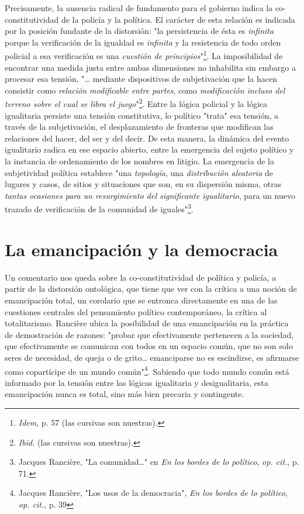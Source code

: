 \documentclass{book}
\begin{document}
Precisamente, la ausencia radical de fundamento para el gobierno indica
la co-constitutividad de la policía y la política. El carácter de esta
relación es indicada por la posición fundante de la distorsión: "la
persistencia de ésta es \emph{infinita} porque la verificación de la
igualdad es \emph{infinita} y la resistencia de todo orden policial a
esa verificación es una \emph{cuestión de principios}"\footnote{\emph{Idem},
  p. 57 (las cursivas son nuestras).}. La imposibilidad de encontrar una
medida justa entre ambas dimensiones no inhabilita sin embargo a
procesar esa tensión, "\ldots{} mediante dispositivos de subjetivación
que la hacen consistir como \emph{relación modificable entre partes},
como \emph{modificación incluso del terreno sobre el cual se libra el
juego}"\footnote{\emph{Ibid.} (las cursivas son nuestras).}. Entre la
lógica policial y la lógica igualitaria persiste una tensión
constitutiva, lo político "trata" esa tensión, a través de la
subjetivación, el desplazamiento de fronteras que modifican las
relaciones del hacer, del ser y del decir. De esta manera, la dinámica
del evento igualitario radica en ese espacio abierto, entre la
emergencia del sujeto político y la instancia de ordenamiento de los
nombres en litigio. La emergencia de la subjetividad política establece
"una \emph{topología}, una \emph{distribución aleatoria} de lugares y
casos, de sitios y situaciones que son, en su dispersión misma, otras
\emph{tantas ocasiones para un resurgimiento del significante
igualitario}, para un nuevo trazado de verificación de la comunidad de
iguales"\footnote{Jacques Rancière, "La comunidad\ldots" en \emph{En los
  bordes de lo político}, \emph{op. cit.}, p. 71.}.

\section{La emancipación y la democracia}

Un comentario nos queda sobre la co-constitutividad de política y
policía, a partir de la distorsión ontológica, que tiene que ver con la
crítica a una noción de emancipación total, un corolario que se entronca
directamente en una de las cuestiones centrales del pensamiento político
contemporáneo, la crítica al totalitarismo. Rancière ubica la
posibilidad de una emancipación en la práctica de demostración de
razones: "probar que efectivamente pertenecen a la sociedad, que
efectivamente se comunican con todos en un espacio común, que no son
solo seres de necesidad, de queja o de grito\ldots{} emanciparse no es
escindirse, es afirmarse como copartícipe de un mundo común"\footnote{Jacques
  Rancière, "Los usos de la democracia", \emph{En los bordes de lo
  político}, \emph{op. cit.}, p. 39}. Sabiendo que todo mundo común está
informado por la tensión entre las lógicas igualitaria y desigualitaria,
esta emancipación nunca es total, sino más bien precaria y contingente.
\end{document}

